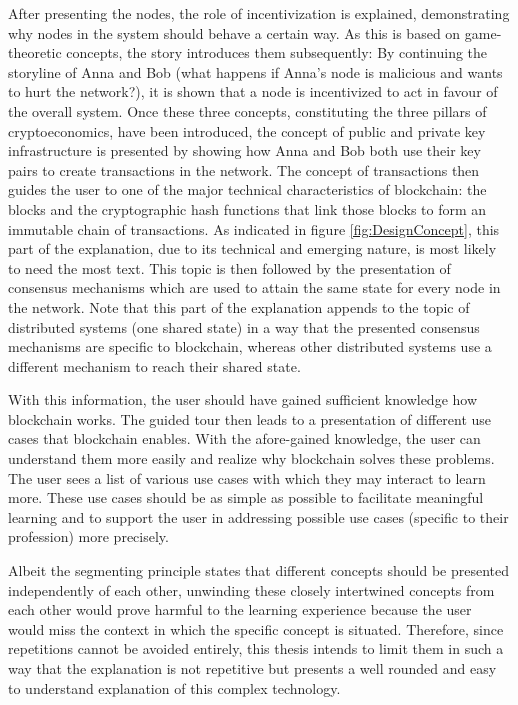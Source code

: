 After presenting the nodes, the role of incentivization is explained, demonstrating why nodes in the system should behave a certain way. As this is based on game-theoretic concepts, the story introduces them subsequently: By continuing the storyline of Anna and Bob (what happens if Anna's node is malicious and wants to hurt the network?), it is shown that a node is incentivized to act in favour of the overall system. Once these three concepts, constituting the three pillars of cryptoeconomics, have been introduced, the concept of public and private key infrastructure is presented by showing how Anna and Bob both use their key pairs to create transactions in the network. The concept of transactions then guides the user to one of the major technical characteristics of blockchain: the blocks and the cryptographic hash functions that link those blocks to form an immutable chain of transactions. As indicated in figure \ref{fig:DesignConcept}, this part of the explanation, due to its technical and emerging nature, is most likely to need the most text. This topic is then followed by the presentation of consensus mechanisms which are used to attain the same state for every node in the network. Note that this part of the explanation appends to the topic of distributed systems (one shared state) in a way that the presented consensus mechanisms are specific to blockchain, whereas other distributed systems use a different mechanism to reach their shared state. 

With this information, the user should have gained sufficient knowledge how blockchain works. The guided tour then leads to a presentation of different use cases that blockchain enables. With the afore-gained knowledge, the user can understand them more easily and realize why blockchain solves these problems. The user sees a list of various use cases with which they may interact to learn more. These use cases should be as simple as possible to facilitate meaningful learning and to support the user in addressing possible use cases (specific to their profession) more precisely.

Albeit the segmenting principle states that different concepts should be presented independently of each other, unwinding these closely intertwined concepts from each other would prove harmful to the learning experience because the user would miss the context in which the specific concept is situated. Therefore, since repetitions cannot be avoided entirely, this thesis intends to limit them in such a way that the explanation is not repetitive but presents a well rounded and easy to understand explanation of this complex technology.

